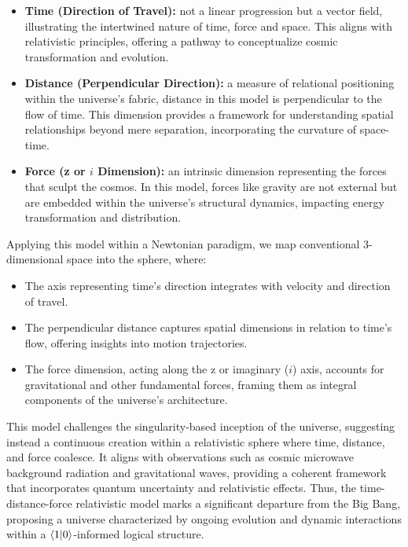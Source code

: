 \documentclass[12pt]{article}
\begin{document}
\begin{itemize}
    \item \textbf{Time (Direction of Travel):} not a linear progression but a vector field, illustrating the intertwined nature of time, force and space. This aligns with relativistic principles, offering a pathway to conceptualize cosmic transformation and evolution.
    \item \textbf{Distance (Perpendicular Direction):} a measure of relational positioning within the universe's fabric, distance in this model is perpendicular to the flow of time. This dimension provides a framework for understanding spatial relationships beyond mere separation, incorporating the curvature of space-time.
    \item \textbf{Force (z or \(i\) Dimension):} an intrinsic dimension representing the forces that sculpt the cosmos. In this model, forces like gravity are not external but are embedded within the universe's structural dynamics, impacting energy transformation and distribution.
\end{itemize}

Applying this model within a Newtonian paradigm, we map conventional 3-dimensional space into the sphere, where:

\begin{itemize}
    \item The axis representing time's direction integrates with velocity and direction of travel.
    \item The perpendicular distance captures spatial dimensions in relation to time's flow, offering insights into motion trajectories.
    \item The force dimension, acting along the z or imaginary (\(i\)) axis, accounts for gravitational and other fundamental forces, framing them as integral components of the universe's architecture.
\end{itemize}

This model challenges the singularity-based inception of the universe, suggesting instead a continuous creation within a relativistic sphere where time, distance, and force coalesce. It aligns with observations such as cosmic microwave background radiation and gravitational waves, providing a coherent framework that incorporates quantum uncertainty and relativistic effects. Thus, the time-distance-force relativistic model marks a significant departure from the Big Bang, proposing a universe characterized by ongoing evolution and dynamic interactions within a \(\langle 1 | 0 \rangle\)-informed logical structure.
\end{document}
